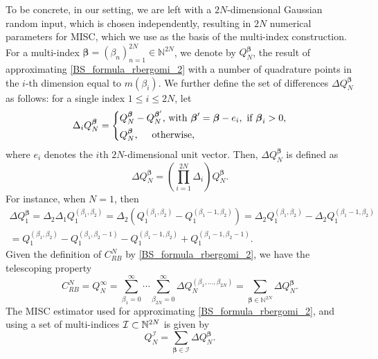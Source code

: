 To be concrete, in our setting, we are left with a $2N$-dimensional Gaussian random input, which is chosen independently, resulting in  $2N$ numerical parameters for MISC, which we use as the basis of the multi-index construction. For a multi-index $\boldsymbol{\beta} = (\beta_n)_{n=1}^{2N} \in \mathbb{N}^{2N}$, we denote  by
$Q_N^{\boldsymbol{\beta}}$,   the result of approximating \eqref{BS_formula_rbergomi_2} with a number of quadrature points  in the $i$-th dimension equal to  $m(\beta_i)$. We further define the set of
differences $\Delta Q_N^{\boldsymbol{\beta}}$ as follows: for a single index $1 \le i \le 2N$,
let
\begin{equation*}
\Delta_i Q_N^{\boldsymbol{\beta}} = \left\{ 
\aligned 
 Q_N^{\boldsymbol{\beta}} &- Q_N^{\boldsymbol{\beta}'}  \text{, with } \boldsymbol{\beta}' =\boldsymbol{\beta} - e_i, \text{ if } \boldsymbol{\beta}_i>0 \COMMA \\
 Q_N^{\boldsymbol{\beta}} &, \quad  \text{ otherwise,}
\endaligned
\right.
\end{equation*}
where $e_i$ denotes the $i$th $2N$-dimensional unit vector. Then, $\Delta
Q_N^{\boldsymbol{\beta}}$ is defined as
\begin{equation*}
\Delta Q_N^{\boldsymbol{\beta}} = \left( \prod_{i=1}^{2N} \Delta_i \right) Q_N^{\boldsymbol{\beta}}.
\end{equation*}
For instance, when $N = 1$, then 
\begin{multline*}
	\Delta Q_1^{\boldsymbol{\beta}} = \Delta_2 \Delta_1 Q_1^{(\beta_1, \beta_2)} = \Delta_2\left( Q_1^{(\beta_1,
		\beta_2)} - Q_1^{(\beta_1-1,\beta_2)} \right) = \Delta_2 Q_1^{(\beta_1,
		\beta_2)} - \Delta_2 Q_1^{(\beta_1-1,\beta_2)} 
	\\= Q_1^{(\beta_1, \beta_2)} - Q_1^{(\beta_1, \beta_2-1)} - Q_1^{(\beta_1-1, \beta_2)} + Q_1^{(\beta_1-1, \beta_2-1)}.
\end{multline*}
Given the definition of $C_{RB}^{N}$ by \eqref{BS_formula_rbergomi_2}, we have the telescoping property
\begin{equation*}
C_{RB}^{N}=Q_N^\infty = \sum_{\beta_1=0}^\infty \cdots \sum_{\beta_{2N} = 0}^\infty \Delta
Q_N^{(\beta_1, \ldots, \beta_{2N})} = \sum_{\boldsymbol{\beta} \in \mathbb{N}^{2N}} \Delta Q_N^{\boldsymbol{\beta}}.
\end{equation*}
 The MISC estimator used for approximating \eqref{BS_formula_rbergomi_2}, and using a set of multi-indices $\mathcal{I}\subset \mathbb{N}^{2N}$ is given by
\begin{equation}\label{eq:MISC_quad_estimator}
	Q_N^{\mathcal{I}} = \sum_{\boldsymbol{\beta} \in \mathcal{I}} \Delta Q_N^{\boldsymbol{\beta}}.
\end{equation}
